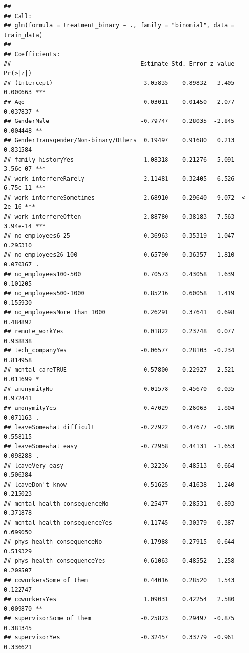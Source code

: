 \documentclass[
]{article}
\begin{document}
\begin{verbatim}
## 
## Call:
## glm(formula = treatment_binary ~ ., family = "binomial", data = train_data)
## 
## Coefficients:
##                                     Estimate Std. Error z value Pr(>|z|)    
## (Intercept)                         -3.05835    0.89832  -3.405 0.000663 ***
## Age                                  0.03011    0.01450   2.077 0.037837 *  
## GenderMale                          -0.79747    0.28035  -2.845 0.004448 ** 
## GenderTransgender/Non-binary/Others  0.19497    0.91680   0.213 0.831584    
## family_historyYes                    1.08318    0.21276   5.091 3.56e-07 ***
## work_interfereRarely                 2.11481    0.32405   6.526 6.75e-11 ***
## work_interfereSometimes              2.68910    0.29640   9.072  < 2e-16 ***
## work_interfereOften                  2.88780    0.38183   7.563 3.94e-14 ***
## no_employees6-25                     0.36963    0.35319   1.047 0.295310    
## no_employees26-100                   0.65790    0.36357   1.810 0.070367 .  
## no_employees100-500                  0.70573    0.43058   1.639 0.101205    
## no_employees500-1000                 0.85216    0.60058   1.419 0.155930    
## no_employeesMore than 1000           0.26291    0.37641   0.698 0.484892    
## remote_workYes                       0.01822    0.23748   0.077 0.938838    
## tech_companyYes                     -0.06577    0.28103  -0.234 0.814958    
## mental_careTRUE                      0.57800    0.22927   2.521 0.011699 *  
## anonymityNo                         -0.01578    0.45670  -0.035 0.972441    
## anonymityYes                         0.47029    0.26063   1.804 0.071163 .  
## leaveSomewhat difficult             -0.27922    0.47677  -0.586 0.558115    
## leaveSomewhat easy                  -0.72958    0.44131  -1.653 0.098288 .  
## leaveVery easy                      -0.32236    0.48513  -0.664 0.506384    
## leaveDon't know                     -0.51625    0.41638  -1.240 0.215023    
## mental_health_consequenceNo         -0.25477    0.28531  -0.893 0.371878    
## mental_health_consequenceYes        -0.11745    0.30379  -0.387 0.699050    
## phys_health_consequenceNo            0.17988    0.27915   0.644 0.519329    
## phys_health_consequenceYes          -0.61063    0.48552  -1.258 0.208507    
## coworkersSome of them                0.44016    0.28520   1.543 0.122747    
## coworkersYes                         1.09031    0.42254   2.580 0.009870 ** 
## supervisorSome of them              -0.25823    0.29497  -0.875 0.381345    
## supervisorYes                       -0.32457    0.33779  -0.961 0.336621    

\end{verbatim}
\end{document}
